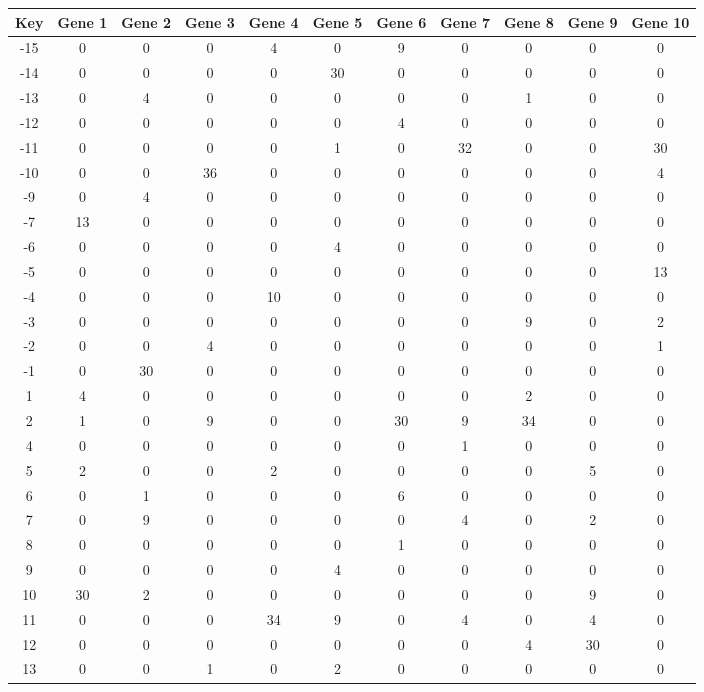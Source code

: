 \begin{tabular}{|c|c|c|c|c|c|c|c|c|c|c|}
\hline
Key & Gene 1 & Gene 2 & Gene 3 & Gene 4 & Gene 5 & Gene 6 & Gene 7 & Gene 8 & Gene 9 & Gene 10 \\
\hline
-15 & 0 & 0 & 0 & 4 & 0 & 9 & 0 & 0 & 0 & 0 \\
-14 & 0 & 0 & 0 & 0 & 30 & 0 & 0 & 0 & 0 & 0 \\
-13 & 0 & 4 & 0 & 0 & 0 & 0 & 0 & 1 & 0 & 0 \\
-12 & 0 & 0 & 0 & 0 & 0 & 4 & 0 & 0 & 0 & 0 \\
-11 & 0 & 0 & 0 & 0 & 1 & 0 & 32 & 0 & 0 & 30 \\
-10 & 0 & 0 & 36 & 0 & 0 & 0 & 0 & 0 & 0 & 4 \\
-9 & 0 & 4 & 0 & 0 & 0 & 0 & 0 & 0 & 0 & 0 \\
-7 & 13 & 0 & 0 & 0 & 0 & 0 & 0 & 0 & 0 & 0 \\
-6 & 0 & 0 & 0 & 0 & 4 & 0 & 0 & 0 & 0 & 0 \\
-5 & 0 & 0 & 0 & 0 & 0 & 0 & 0 & 0 & 0 & 13 \\
-4 & 0 & 0 & 0 & 10 & 0 & 0 & 0 & 0 & 0 & 0 \\
-3 & 0 & 0 & 0 & 0 & 0 & 0 & 0 & 9 & 0 & 2 \\
-2 & 0 & 0 & 4 & 0 & 0 & 0 & 0 & 0 & 0 & 1 \\
-1 & 0 & 30 & 0 & 0 & 0 & 0 & 0 & 0 & 0 & 0 \\
1 & 4 & 0 & 0 & 0 & 0 & 0 & 0 & 2 & 0 & 0 \\
2 & 1 & 0 & 9 & 0 & 0 & 30 & 9 & 34 & 0 & 0 \\
4 & 0 & 0 & 0 & 0 & 0 & 0 & 1 & 0 & 0 & 0 \\
5 & 2 & 0 & 0 & 2 & 0 & 0 & 0 & 0 & 5 & 0 \\
6 & 0 & 1 & 0 & 0 & 0 & 6 & 0 & 0 & 0 & 0 \\
7 & 0 & 9 & 0 & 0 & 0 & 0 & 4 & 0 & 2 & 0 \\
8 & 0 & 0 & 0 & 0 & 0 & 1 & 0 & 0 & 0 & 0 \\
9 & 0 & 0 & 0 & 0 & 4 & 0 & 0 & 0 & 0 & 0 \\
10 & 30 & 2 & 0 & 0 & 0 & 0 & 0 & 0 & 9 & 0 \\
11 & 0 & 0 & 0 & 34 & 9 & 0 & 4 & 0 & 4 & 0 \\
12 & 0 & 0 & 0 & 0 & 0 & 0 & 0 & 4 & 30 & 0 \\
13 & 0 & 0 & 1 & 0 & 2 & 0 & 0 & 0 & 0 & 0 \\
\hline
\end{tabular}